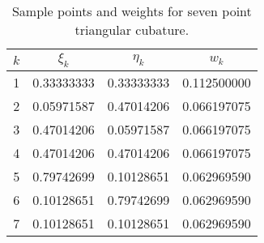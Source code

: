 \begin{table}
  \begin{center}
    \begin{tabular}{|c|c|c|c|}  \hline
      {\boldmath $k$\unboldmath\rule[-.5ex]{0ex}{3ex}} &  
      {\boldmath $\xi_k$} \unboldmath  & 
      {\boldmath $\eta_k$ \unboldmath} & {\boldmath $w_k$ \unboldmath} 
      \\ \hline
      1 & 0.33333333    & 0.33333333    & 0.112500000 \\
      2 & 0.05971587    & 0.47014206    & 0.066197075 \\
      3 & 0.47014206    & 0.05971587    & 0.066197075 \\
      4 & 0.47014206    & 0.47014206    & 0.066197075 \\
      5 & 0.79742699    & 0.10128651    & 0.062969590 \\
      6 & 0.10128651    & 0.79742699    & 0.062969590 \\
      7 & 0.10128651    & 0.10128651    & 0.062969590 \\
      \hline 
    \end{tabular}
  \end{center}
  \caption{Sample points and weights for seven point triangular cubature.}
  \label{tab:tri}
\end{table}

